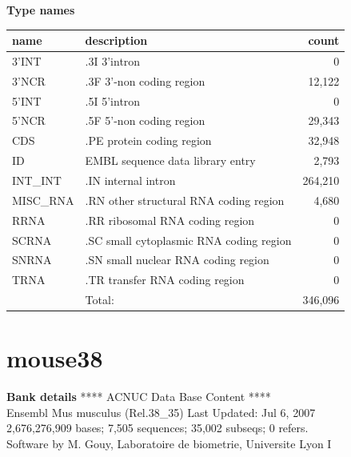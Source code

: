 \documentclass{article}
\begin{document}
\begin{Schunk}
\textbf{Type names}
\noindent\begin{tabular}{llr}
\hline \hline
name & description & count \\
\hline
3'INT  &  .3I 3'intron  &  0 \\
3'NCR  &  .3F  3'-non coding region  &  12,122 \\
5'INT  &  .5I 5'intron  &  0 \\
5'NCR  &  .5F  5'-non coding region  &  29,343 \\
CDS  &  .PE protein coding region  &  32,948 \\
ID  &  EMBL sequence data library entry  &  2,793 \\
INT\_INT  &  .IN  internal intron  &  264,210 \\
MISC\_RNA  &  .RN other structural RNA coding region  &  4,680 \\
RRNA  &  .RR ribosomal RNA coding region  &  0 \\
SCRNA  &  .SC small cytoplasmic RNA coding region  &  0 \\
SNRNA  &  .SN small nuclear RNA coding region  &  0 \\
TRNA  &  .TR transfer RNA coding region  &  0 \\
\hline
 & Total: & 346,096 \\
\hline \hline
\end{tabular}

\section{ mouse38 }
\textbf{Bank details}
             ****     ACNUC Data Base Content      ****                         \\
          Ensembl Mus musculus (Rel.38\_35) Last Updated: Jul  6, 2007\\
2,676,276,909 bases; 7,505 sequences; 35,002 subseqs; 0 refers.\\
Software by M. Gouy, Laboratoire de biometrie, Universite Lyon I 


\end{Schunk}
\end{document}
